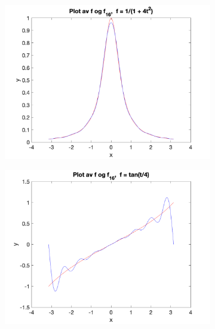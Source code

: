 \documentclass[12pt,
               a4paper,
               article,
               oneside,
               oldfontcommands,
               norsk]{memoir}
\begin{document}
\begin{figure}[H]
	\centering
	\begin{subfigure}[H]{0.8\textwidth}
	\centering
	\includegraphics[width=\textwidth]{oppgave_9.png}
	\end{subfigure}
	\vfill
	\begin{subfigure}[H]{0.8\textwidth}
	\centering
	\includegraphics[width=\textwidth]{oppgave_9_b.png} 
	\end{subfigure}
\end{figure}
\end{document}
